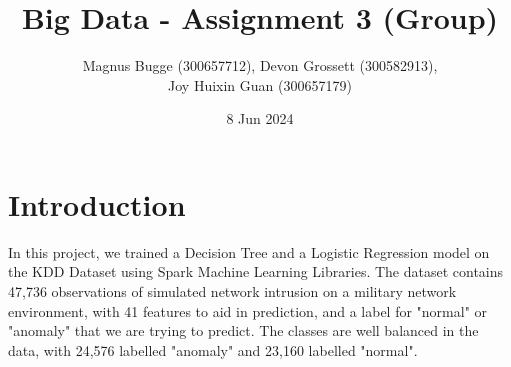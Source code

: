 \documentclass[12pt, letterpaper]{article}
\title{Big Data - Assignment 3 (Group)}
\author{Magnus Bugge (300657712), Devon Grossett (300582913), \\ Joy Huixin Guan (300657179)}
\date{8 Jun 2024}
\begin{document}
\maketitle

\section{Introduction}
In this project, we trained a Decision Tree and a Logistic Regression model on the KDD Dataset 
\cite{JAM} using Spark Machine Learning Libraries. The dataset contains 47,736 observations of simulated network intrusion on a military network environment, with 41 features to aid in prediction, and a label for "normal" or "anomaly" that we are trying to predict. The classes are well balanced in the data, with 24,576 labelled "anomaly" and 23,160 labelled "normal".
\end{document}
